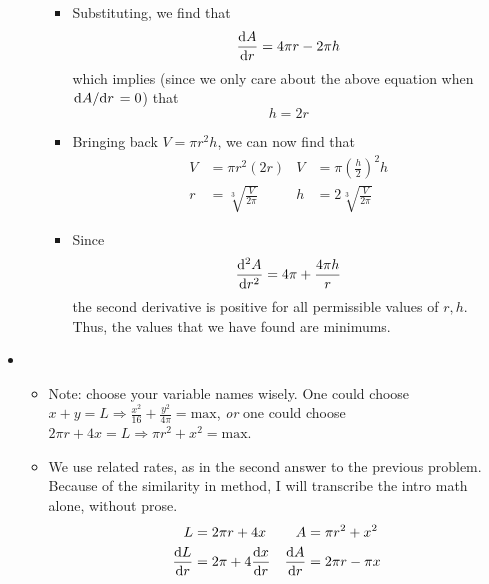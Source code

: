\documentclass[../main.tex]{subfiles}
\begin{document}
\begin{itemize}
\begin{itemize}
\begin{itemize}
            \item Substituting, we find that
            \begin{equation*}
                \dv{A}{r} = 4\pi r-2\pi h
            \end{equation*}
            which implies (since we only care about the above equation when $\dv*{A}{r}=0$) that
            \begin{equation*}
                h = 2r
            \end{equation*}
            \item Bringing back $V=\pi r^2h$, we can now find that
            \begin{align*}
                V &= \pi r^2(2r)&
                    V &= \pi \left( \frac{h}{2} \right)^2h\\
                r &= \sqrt[3]{\frac{V}{2\pi}}&
                    h &= 2\sqrt[3]{\frac{V}{2\pi}}
            \end{align*}
            \item Since
            \begin{equation*}
                \dv[2]{A}{r} = 4\pi+\frac{4\pi h}{r}
            \end{equation*}
            the second derivative is positive for all permissible values of $r,h$. Thus, the values that we have found are minimums.
        \end{itemize}
    \end{itemize}
    \item {}
    \begin{itemize}
        \item Note: choose your variable names wisely. One could choose $x+y=L \Rightarrow \frac{x^2}{16}+\frac{y^2}{4\pi}=\text{max}$, \emph{or} one could choose $2\pi r+4x=L \Rightarrow \pi r^2+x^2=\text{max}$.
        \item We use related rates, as in the second answer to the previous problem. Because of the similarity in method, I will transcribe the intro math alone, without prose.
        \begin{align*}
            L &= 2\pi r+4x&
                A &= \pi r^2+x^2\\
            \dv{L}{r} &= 2\pi+4\dv{x}{r}&
                \dv{A}{r} &= 2\pi r-\pi x\\

\end{align*}
\end{itemize}
\end{itemize}
\end{document}
